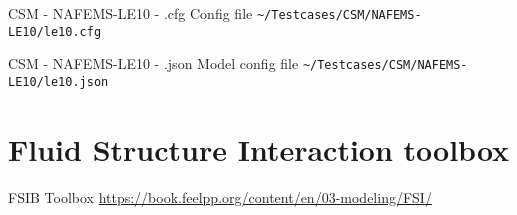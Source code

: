 \begin{frame}{CSM - NAFEMS-LE10 - .cfg}
Config file \lstinline{~/Testcases/CSM/NAFEMS-LE10/le10.cfg}

\framebreak
\end{frame}


\begin{frame}{CSM - NAFEMS-LE10 - .json}
Model config file \lstinline{~/Testcases/CSM/NAFEMS-LE10/le10.json}

\framebreak
\end{frame}


















\section[FSI]{Fluid Structure Interaction toolbox}

\begin{frame}[standout]{FSIB Toolbox}
  \url{https://book.feelpp.org/content/en/03-modeling/FSI/}
\end{frame}



